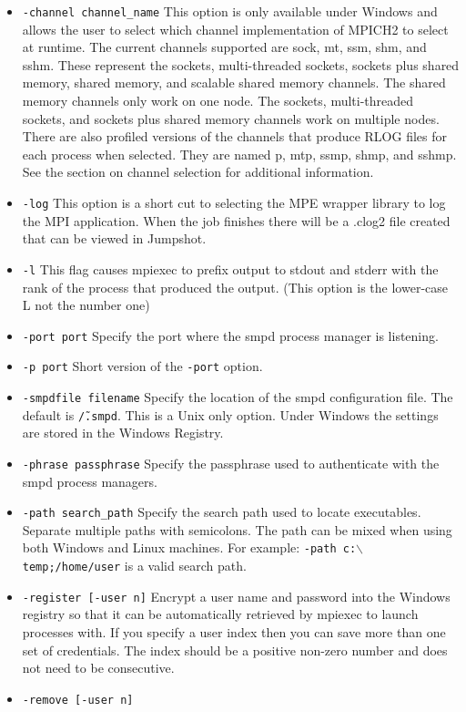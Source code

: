 \documentclass[dvipdfm,11pt]{article}
\begin{document}
\begin{itemize}
\item \texttt{-channel channel\_name}
This option is only available under Windows and allows the user to select which
channel implementation of MPICH2 to select at runtime.  The current channels
supported are sock, mt, ssm, shm, and sshm.  These represent the sockets, 
multi-threaded sockets, sockets plus shared memory, shared memory, and scalable
shared memory channels.  The shared memory channels only work on one node.  
The sockets, multi-threaded sockets, and sockets plus shared memory channels 
work on multiple nodes.  There are also profiled versions of the channels that
produce RLOG files for each process when selected.  They are named p, mtp, ssmp,
shmp, and sshmp.  See the section on channel selection for additional information.
\item \texttt{-log}
This option is a short cut to selecting the MPE wrapper library to log the MPI
application.  When the job finishes there will be a .clog2 file created that
can be viewed in Jumpshot.
\item \texttt{-l}
This flag causes mpiexec to prefix output to stdout and stderr with the rank of
the process that produced the output.  (This option is the lower-case L not the
number one)
\item \texttt{-port port}
Specify the port where the smpd process manager is listening.
\item \texttt{-p port}
Short version of the \texttt{-port} option.
\item \texttt{-smpdfile filename}
Specify the location of the smpd configuration file.  The default is \texttt{\~/.smpd}.
This is a Unix only option.  Under Windows the settings are stored in the Windows Registry.
\item \texttt{-phrase passphrase}
Specify the passphrase used to authenticate with the smpd process managers.
\item \texttt{-path search\_path}
Specify the search path used to locate executables.  Separate multiple paths with semicolons.
The path can be mixed when using both Windows and Linux machines.  For example:
\texttt{-path c:$\backslash$temp;/home/user} is a valid search path.
\item \texttt{-register [-user n]}
Encrypt a user name and password into the Windows registry so that it can be 
automatically retrieved by mpiexec to launch processes with.  If you specify
a user index then you can save more than one set of credentials.  The index
should be a positive non-zero number and does not need to be consecutive.
\item \texttt{-remove [-user n]}

\end{itemize}
\end{document}
